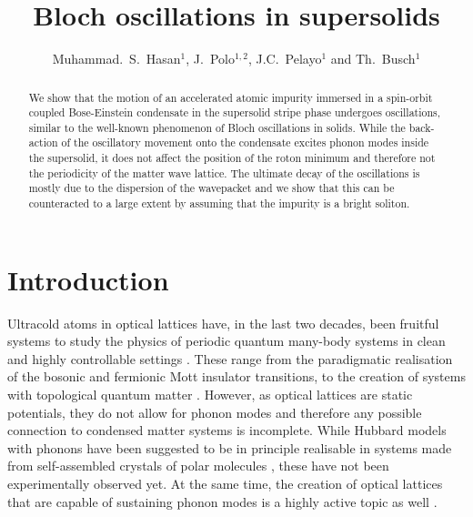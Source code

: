 \documentclass[12pt]{iopart}
\begin{document}
\title {Bloch oscillations in supersolids}

\author{Muhammad.~S.~Hasan$^1$, J.~Polo$^{1,2}$, J.C.~Pelayo$^1$ and Th.~Busch$^1$}

\address{$^1$Quantum Systems Unit, Okinawa Institute of Science and Technology Graduate University, Okinawa, Japan 904-0495}
\address{$^2$Quantum Research Centre, Technology Innovation Institute, Abu Dhabi, UAE}


\vspace{10pt}

\begin{abstract}
We show that the motion of an accelerated atomic impurity immersed in a spin-orbit coupled Bose-Einstein condensate in the supersolid stripe phase undergoes oscillations, similar to the well-known phenomenon of Bloch oscillations in solids. While the back-action of the oscillatory movement onto the condensate excites phonon modes inside the supersolid, 
it does not affect the position of the roton minimum and therefore not the periodicity of the matter wave lattice. The ultimate decay of the oscillations is mostly due to the dispersion of the wavepacket and we show that this can be counteracted to a large extent by assuming that the impurity is a bright soliton.
\end{abstract}

\section{Introduction}
Ultracold atoms in optical lattices have, in the last two decades, been fruitful systems to study the physics of periodic quantum many-body systems in clean and highly controllable settings \cite{Bloch:08,Gross:17}. These range from the paradigmatic realisation of the bosonic \cite{Greiner:2002} and fermionic \cite{Jordens:2008,Schneider:2008} Mott insulator transitions, to the creation of systems with topological quantum matter \cite{Goldman:2016}. However, as optical lattices are static potentials, they do not allow for phonon modes and therefore any possible connection to condensed matter systems is incomplete. While Hubbard models with phonons have been suggested to be in principle realisable in systems made from self-assembled crystals of polar molecules \cite{Pupillo:2008}, these have not been experimentally observed yet. At the same time, the creation of optical lattices that are capable of sustaining phonon modes is a highly active topic as well \cite{guo2021optical}.
\end{document}
